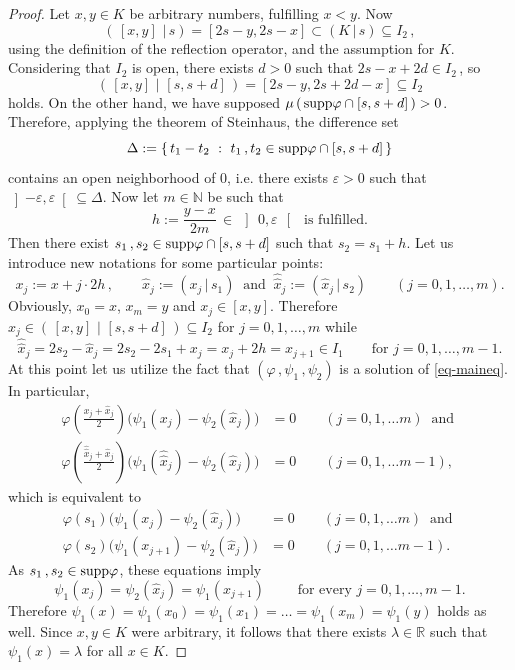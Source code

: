 \documentclass[12pt]{amsart}
\theoremstyle{remark}
\theoremstyle{definition}
\newcommand{\NN}{\mathbb{N}}
\newcommand{\RR}{\mathbb{R}}
\newcommand{\supp}{\mbox{\rm supp}}
\newcommand{\rfl}[2]{\left( #1 \, \vert \, #2 \right)}
\begin{document}
\begin{proof}
Let 
$ x,y \in K $ be arbitrary numbers, 
fulfilling $ x < y $. 
Now 
\[ 
\rfl{ \, [x,y] \, }{s} = 
\left[ 2s-y, 2s-x \right] 
\subset \rfl{K}{s} \subseteq I_2 \,, 
\]
using the definition of the reflection operator, 
and the assumption for $ K $. 
Considering that $ I_2 $ is open, 
there exists $ d > 0 $ such that 
$ 2s - x + 2d \in I_2 \,$, so 
\[
\rfl{ \, [x,y] \, }{ \, [s, s+d] \, } = 
\left[ 2s-y , 2s + 2d -x \right] \subseteq I_2 
\]
holds. 
On the other hand, we have supposed 
$ \mu \left( \, \supp \varphi \cap 
\left[ s, s + d \right] \, \right) > 0 $. 
Therefore, applying the 
theorem of Steinhaus, the difference set 
\[
\Delta := \lbrace \, t_1 - t_2 \ : \ 
t_1 \,, t_2 \in \supp \varphi \cap [s,s+d] \, \rbrace
\] 
contains an open neighborhood of $ 0 $, 
i.e. there exists 
$ \varepsilon > 0 $ such that 
$ \left] - \varepsilon , \varepsilon 
\right[ \subseteq \Delta $. 
Now let $ m \in \NN $ be such that 
\[
h := \frac{y-x}{2m} \, \in \, 
\left] \, 0, \varepsilon \, \right[ 
\, \mbox{ is fulfilled}.
\]
Then there exist 
$ s_1 \,, s_2 \in \supp \varphi \cap [s, s+d] $ 
such that 
$ s_2 = s_1 + h $. 
Let us introduce new notations 
for some particular points: 
\[
x_j := x + j \cdot 2h \,, \qquad 
\widehat{x}_j := \rfl{x_j}{s_1} \ \mbox{ and } \ 
\widehat{\widehat{x}}_j := \rfl{\widehat{x}_j}{s_2} 
\qquad (j = 0,1, \dots , m).
\]
Obviously, 
$ x_0 = x $, $ x_m = y $ and $ x_j \in [x,y] $. 
Therefore 
$ \widehat{x}_j \in 
\rfl{\, [x,y] \,}{\, [s,s+d] \,} \subseteq I_2 $ 
for $ j=0,1, \dots ,m $ while 
\[
\widehat{\widehat{x}}_j = 2s_2 - \widehat{x}_j = 
2s_2 - 2s_1 + x_j = x_j + 2h = x_{j+1} \in I_1 
\qquad \mbox{for } j = 0,1, \dots , m-1. 
\] 
At this point let us utilize the fact that 
$ \left( \varphi \,, \psi_1 \,, \psi_2 \right) $ 
is a solution of \eqref{eq-maineq}. 
In particular, 
\begin{align*}
\varphi \left( 
\frac{x_j + \widehat{x}_j}{2} \right) 
\bigl( 
\psi_1 (x_j) - \psi_2(\widehat{x}_j) 
\bigr) &= 0 
\qquad (j = 0,1, \dots m) \ \mbox{ and } \\ 
\varphi \left( 
\frac{\widehat{\widehat{x}}_j + \widehat{x}_j}{2} \right) 
\bigl( 
\psi_1 (\widehat{\widehat{x}}_j) - \psi_2(\widehat{x}_j) 
\bigr) &= 0 
\qquad (j = 0,1, \dots m-1), 
\end{align*} 
which is equivalent to 
\begin{align*} 
\varphi \left( s_1 \right) 
\bigl( 
\psi_1 (x_j) - \psi_2(\widehat{x}_j) 
\bigr) &= 0 
\qquad (j = 0,1, \dots m) \ \mbox{ and } \\ 
\varphi \left( s_2 \right) 
\bigl( 
\psi_1 (x_{j+1}) - \psi_2(\widehat{x}_j) 
\bigr) &= 0 
\qquad (j = 0,1, \dots m-1).  
\end{align*} 
As $ s_1 \,, s_2 \in \supp \varphi $, 
these equations imply 
\[ 
\psi_1(x_j) = \psi_2( \widehat{x}_j ) = \psi_1(x_{j+1}) 
\qquad \mbox{ for every } 
j = 0,1, \dots ,m-1.
\]
Therefore 
$ \psi_1(x) = \psi_1 (x_0) = \psi_1 (x_1) = \dots = 
\psi_1 (x_m) = \psi_1(y) $ 
holds as well. 
Since $ x,y \in K $ were arbitrary, it follows 
that there exists 
$ \lambda \in \RR $ such that 
$ \psi_1(x) = \lambda$  for all $ x \in K $. 


\end{proof}
\end{document}
